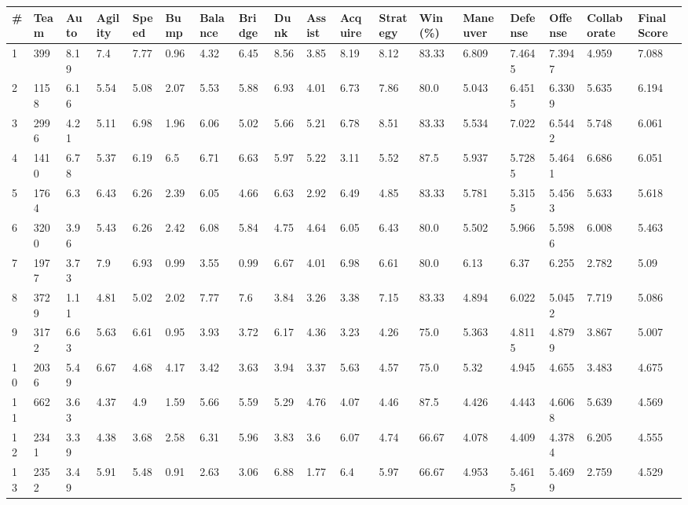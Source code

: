 \documentclass[landscape, 10pt]{report}
\begin{document}
\begin{longtable}{l || l || l | l | l | l | l | l | l | l | l | l | l || l | l | l | l | l} 
\# & Team & Auto & Agility & Speed & Bump & Balance & Bridge & Dunk & Assist & Acquire & Strategy & Win (\%) & Maneuver & Defense & Offense & Collaborate & Final Score \\ \hline \endhead 
\rowcolor{lightgray}1 & 399 & 8.19 & 7.4 & 7.77 & 0.96 & 4.32 & 6.45 & 8.56 & 3.85 & 8.19 & 8.12 & 83.33 & 6.809 & 7.4645 & 7.3947 & 4.959 & 7.088\\ 
2 & 1158 & 6.16 & 5.54 & 5.08 & 2.07 & 5.53 & 5.88 & 6.93 & 4.01 & 6.73 & 7.86 & 80.0 & 5.043 & 6.4515 & 6.3309 & 5.635 & 6.194\\ 
\rowcolor{lightgray}3 & 2996 & 4.21 & 5.11 & 6.98 & 1.96 & 6.06 & 5.02 & 5.66 & 5.21 & 6.78 & 8.51 & 83.33 & 5.534 & 7.022 & 6.5442 & 5.748 & 6.061\\ 
4 & 1410 & 6.78 & 5.37 & 6.19 & 6.5 & 6.71 & 6.63 & 5.97 & 5.22 & 3.11 & 5.52 & 87.5 & 5.937 & 5.7285 & 5.4641 & 6.686 & 6.051\\ 
\rowcolor{lightgray}5 & 1764 & 6.3 & 6.43 & 6.26 & 2.39 & 6.05 & 4.66 & 6.63 & 2.92 & 6.49 & 4.85 & 83.33 & 5.781 & 5.3155 & 5.4563 & 5.633 & 5.618\\ 
6 & 3200 & 3.96 & 5.43 & 6.26 & 2.42 & 6.08 & 5.84 & 4.75 & 4.64 & 6.05 & 6.43 & 80.0 & 5.502 & 5.966 & 5.5986 & 6.008 & 5.463\\ 
\rowcolor{lightgray}7 & 1977 & 3.73 & 7.9 & 6.93 & 0.99 & 3.55 & 0.99 & 6.67 & 4.01 & 6.98 & 6.61 & 80.0 & 6.13 & 6.37 & 6.255 & 2.782 & 5.09\\ 
8 & 3729 & 1.11 & 4.81 & 5.02 & 2.02 & 7.77 & 7.6 & 3.84 & 3.26 & 3.38 & 7.15 & 83.33 & 4.894 & 6.022 & 5.0452 & 7.719 & 5.086\\ 
\rowcolor{lightgray}9 & 3172 & 6.63 & 5.63 & 6.61 & 0.95 & 3.93 & 3.72 & 6.17 & 4.36 & 3.23 & 4.26 & 75.0 & 5.363 & 4.8115 & 4.8799 & 3.867 & 5.007\\ 
10 & 2036 & 5.49 & 6.67 & 4.68 & 4.17 & 3.42 & 3.63 & 3.94 & 3.37 & 5.63 & 4.57 & 75.0 & 5.32 & 4.945 & 4.655 & 3.483 & 4.675\\ 
\rowcolor{lightgray}11 & 662 & 3.63 & 4.37 & 4.9 & 1.59 & 5.66 & 5.59 & 5.29 & 4.76 & 4.07 & 4.46 & 87.5 & 4.426 & 4.443 & 4.6068 & 5.639 & 4.569\\ 
12 & 2341 & 3.39 & 4.38 & 3.68 & 2.58 & 6.31 & 5.96 & 3.83 & 3.6 & 6.07 & 4.74 & 66.67 & 4.078 & 4.409 & 4.3784 & 6.205 & 4.555\\ 
\rowcolor{lightgray}13 & 2352 & 3.49 & 5.91 & 5.48 & 0.91 & 2.63 & 3.06 & 6.88 & 1.77 & 6.4 & 5.97 & 66.67 & 4.953 & 5.4615 & 5.4699 & 2.759 & 4.529\\ 

\end{longtable}
\end{document}
